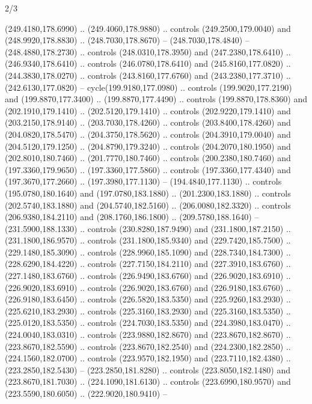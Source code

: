 \begin{flagdescription}{2/3}
\begin{scope}[xshift=0.5\flaglength,yshift=0.5\flagwidth,scale=\flagwidth/259.2]
\begin{scope}[y=0.8pt, x=0.8pt, yscale=-1,shift={(-243,-162)}]
      (249.4180,178.6990) .. (249.4060,178.9880) .. controls (249.2500,179.0040) and
      (248.9920,178.8830) .. (248.7030,178.8670) -- (248.7030,178.4840) --
      (248.4880,178.2730) .. controls (248.0310,178.3950) and (247.2380,178.6410) ..
      (246.9340,178.6410) .. controls (246.0780,178.6410) and (245.8160,177.0820) ..
      (244.3830,178.0270) .. controls (243.8160,177.6760) and (243.2380,177.3710) ..
      (242.6130,177.0820) -- cycle(199.9180,177.0980) .. controls
      (199.9020,177.2190) and (199.8870,177.3400) .. (199.8870,177.4490) .. controls
      (199.8870,178.8360) and (202.1910,179.1410) .. (202.5120,179.1410) .. controls
      (202.9220,179.1410) and (203.2150,178.9140) .. (203.7030,178.4260) .. controls
      (203.8400,178.4260) and (204.0820,178.5470) .. (204.3750,178.5620) .. controls
      (204.3910,179.0040) and (204.5120,179.1250) .. (204.8790,179.3240) .. controls
      (204.2070,180.1950) and (202.8010,180.7460) .. (201.7770,180.7460) .. controls
      (200.2380,180.7460) and (197.3360,179.9650) .. (197.3360,177.5860) .. controls
      (197.3360,177.4340) and (197.3670,177.2660) .. (197.3980,177.1130) --
      (194.4840,177.1130) .. controls (195.0780,180.1640) and (197.0780,183.1880) ..
      (201.2300,183.1880) .. controls (202.5740,183.1880) and (204.5740,182.5160) ..
      (206.0080,182.3320) .. controls (206.9380,184.2110) and (208.1760,186.1800) ..
      (209.5780,188.1640) -- (231.5900,188.1330) .. controls (230.8280,187.9490) and
      (231.1800,187.2150) .. (231.1800,186.9570) .. controls (231.1800,185.9340) and
      (229.7420,185.7500) .. (229.1480,185.3090) .. controls (228.9960,185.1090) and
      (228.7340,184.7300) .. (228.6290,184.4220) .. controls (227.7150,184.2110) and
      (227.3910,183.6760) .. (227.1480,183.6760) .. controls (226.9490,183.6760) and
      (226.9020,183.6910) .. (226.9020,183.6910) .. controls (226.9020,183.6760) and
      (226.9180,183.6760) .. (226.9180,183.6450) .. controls (226.5820,183.5350) and
      (225.9260,183.2930) .. (225.6210,183.2930) .. controls (225.3160,183.2930) and
      (225.3160,183.5350) .. (225.0120,183.5350) .. controls (224.7030,183.5350) and
      (224.3980,183.0470) .. (224.0040,183.0310) .. controls (223.9880,182.8670) and
      (223.8670,182.8670) .. (223.8670,182.5590) .. controls (223.8670,182.2540) and
      (224.2300,182.2850) .. (224.1560,182.0700) .. controls (223.9570,182.1950) and
      (223.7110,182.4380) .. (223.2850,182.5430) -- (223.2850,181.8280) .. controls
      (223.8050,182.1480) and (223.8670,181.7030) .. (224.1090,181.6130) .. controls
      (223.6990,180.9570) and (223.5590,180.6050) .. (222.9020,180.9410) --

\end{scope}
\end{scope}
\end{flagdescription}
